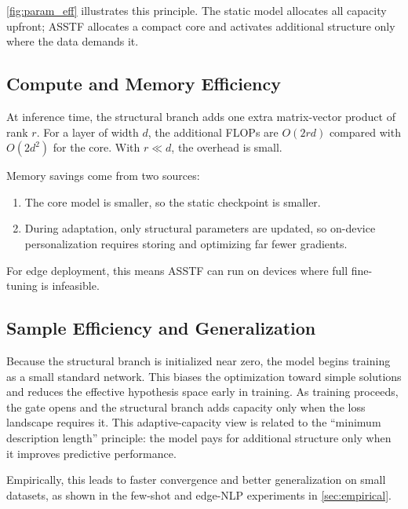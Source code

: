 \documentclass[11pt,a4paper]{article}
\theoremstyle{definition}
\begin{document}
\cref{fig:param_eff} illustrates this principle. The static model allocates all capacity upfront; ASSTF allocates a compact core and activates additional structure only where the data demands it.

\subsection{Compute and Memory Efficiency}
\label{subsec:compute_eff}

At inference time, the structural branch adds one extra matrix-vector product of rank $r$. For a layer of width $d$, the additional FLOPs are $O(2 r d)$ compared with $O(2 d^2)$ for the core. With $r \ll d$, the overhead is small.

Memory savings come from two sources:
\begin{enumerate}
    \item The core model is smaller, so the static checkpoint is smaller.
    \item During adaptation, only structural parameters are updated, so on-device personalization requires storing and optimizing far fewer gradients.
\end{enumerate}

For edge deployment, this means ASSTF can run on devices where full fine-tuning is infeasible.

\subsection{Sample Efficiency and Generalization}
\label{subsec:sample_eff}

Because the structural branch is initialized near zero, the model begins training as a small standard network. This biases the optimization toward simple solutions and reduces the effective hypothesis space early in training. As training proceeds, the gate opens and the structural branch adds capacity only when the loss landscape requires it. This adaptive-capacity view is related to the ``minimum description length'' principle: the model pays for additional structure only when it improves predictive performance.

Empirically, this leads to faster convergence and better generalization on small datasets, as shown in the few-shot and edge-NLP experiments in \cref{sec:empirical}.
\end{document}
